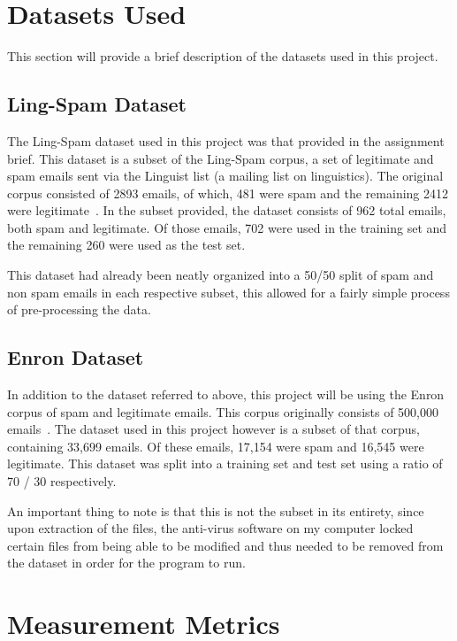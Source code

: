 \documentclass[11pt, a4paper]{article}
\begin{document}
\section{Datasets Used} 

This section will provide a brief description of the datasets used in this project.

\subsection{Ling-Spam Dataset} 

The Ling-Spam dataset used in this project was that provided in the assignment brief. This dataset is a subset of the Ling-Spam corpus, a set of legitimate and spam emails sent via the Linguist list (a mailing list on linguistics). The original corpus consisted of 2893 emails, of which, 481 were spam and the remaining 2412 were legitimate~\cite{sakkis2003memory}. In the subset provided, the dataset consists of 962 total emails, both spam and legitimate. Of those emails, 702 were used in the training set and the remaining 260 were used as the test set. 

This dataset had already been neatly organized into a 50/50 split of spam and non spam emails in each respective subset, this allowed for a fairly simple process of pre-processing the data.

\subsection{Enron Dataset}

In addition to the dataset referred to above, this project will be using the Enron corpus of spam and legitimate emails. This corpus originally consists of 500,000 emails~\cite{enron}. The dataset used in this project however is a subset of that corpus, containing 33,699 emails. Of these emails, 17,154 were spam and 16,545 were legitimate. This dataset was split into a training set and test set using a ratio of 70 / 30 respectively.

An important thing to note is that this is not the subset in its entirety, since upon extraction of the files, the anti-virus software on my computer locked certain files from being able to be modified and thus needed to be removed from the dataset in order for the program to run.

\section{Measurement Metrics}
\end{document}
